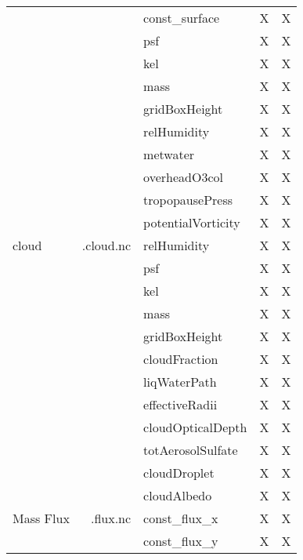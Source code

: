 \begin{center}
\begin{longtable}{|l|r|l|l|l|}
             &                  & const\_surface & X   &    X    \\
             &                  & psf            & X   &    X    \\
             &                  & kel            & X   &    X    \\
             &                  & mass           & X   &    X    \\
             &                  & gridBoxHeight    & X   &  X      \\
             &                  & relHumidity      & X   &  X      \\
             &                  & metwater         & X   &  X      \\
             &                  & overheadO3col    & X   &  X      \\
             &                  & tropopausePress& X   &    X    \\
             &                  & potentialVorticity& X &   X    \\ \hline
%
cloud        & .cloud.nc        & relHumidity       & X & X     \\
             &                  & psf               & X & X     \\
             &                  & kel               & X & X     \\
             &                  & mass              & X & X     \\
             &                  & gridBoxHeight     & X & X     \\
             &                  & cloudFraction     & X & X     \\
             &                  & liqWaterPath      & X & X     \\
             &                  & effectiveRadii    & X & X     \\
             &                  & cloudOpticalDepth & X & X     \\
             &                  & totAerosolSulfate & X & X     \\
             &                  & cloudDroplet      & X & X     \\
             &                  & cloudAlbedo       & X & X     \\ \hline
%
Mass Flux    &   .flux.nc       & const\_flux\_x & X    &    X     \\
             &                  & const\_flux\_y & X    &    X     \\

\end{longtable}
\end{center}
